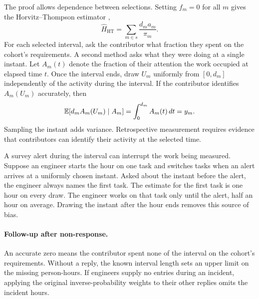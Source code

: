 The proof allows dependence between selections. Setting $f_m=0$ for all $m$ gives the Horvitz--Thompson estimator \cite{horvitz1952},
\begin{equation}
 \widehat H_{\mathrm{HT}}=\sum_{m\in s}\frac{d_ma_m}{\pi_m}.
 \label{eq:ht}
\end{equation}
For each selected interval, ask the contributor what fraction they spent on the cohort's requirements. A second method asks what they were doing at a single instant. Let $A_m(t)$ denote the fraction of their attention the work occupied at elapsed time $t$. Once the interval ends, draw $U_m$ uniformly from $[0,d_m]$ independently of the activity during the interval. If the contributor identifies $A_m(U_m)$ accurately, then
\[
  \mathbb E\!\left[d_m A_m(U_m)\mid A_m\right]
  =\int_0^{d_m} A_m(t)\,dt=y_m.
\]
Sampling the instant adds variance. Retrospective measurement requires evidence that contributors can identify their activity at the selected time.

A survey alert during the interval can interrupt the work being measured. Suppose an engineer starts the hour on one task and switches tasks when an alert arrives at a uniformly chosen instant. Asked about the instant before the alert, the engineer always names the first task. The estimate for the first task is one hour on every draw. The engineer works on that task only until the alert, half an hour on average. Drawing the instant after the hour ends removes this source of bias.

\paragraph{Follow-up after non-response.}
An accurate zero means the contributor spent none of the interval on the cohort's requirements. Without a reply, the known interval length sets an upper limit on the missing person-hours. If engineers supply no entries during an incident, applying the original inverse-probability weights to their other replies omits the incident hours.

